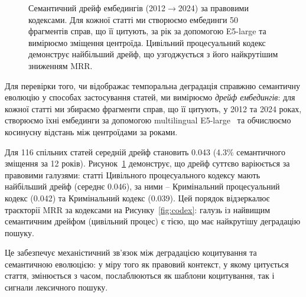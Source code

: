 \begin{figure}[t]
\centering

\caption{Семантичний дрейф ембедингів (2012$\to$2024) за правовими кодексами. Для кожної статті ми створюємо ембединги 50 фрагментів справ, що її цитують, за рік за допомогою E5-large та вимірюємо зміщення центроїда. Цивільний процесуальний кодекс демонструє найбільший дрейф, що узгоджується з його найкрутішим зниженням MRR.}
\label{fig:drift}
\end{figure}

Для перевірки того, чи відображає темпоральна деградація справжню семантичну еволюцію у способах застосування статей, ми вимірюємо \emph{дрейф ембедингів}: для кожної статті ми збираємо фрагменти справ, що її цитують, у 2012 та 2024 роках, створюємо їхні ембединги за допомогою multilingual E5-large~\citep{wang2024multilingual} та обчислюємо косинусну відстань між центроїдами за роками.

Для 116 спільних статей середній дрейф становить 0.043 (4.3\% семантичного зміщення за 12 років).
Рисунок~\ref{fig:drift} демонструє, що дрейф суттєво варіюється за правовими галузями:
статті Цивільного процесуального кодексу мають найбільший дрейф (середнє 0.046), за ними -- Кримінальний процесуальний кодекс (0.042) та Кримінальний кодекс (0.039).
Цей порядок відзеркалює траєкторії MRR за кодексами на Рисунку~\ref{fig:codex}: галузь із найвищим семантичним дрейфом (цивільний процес) є тією, що має найкрутішу деградацію пошуку.

Це забезпечує механістичний зв'язок між деградацією коцитування та семантичною еволюцією: у міру того як правовий контекст, у якому цитується стаття, змінюється з часом, послаблюються як шаблони коцитування, так і сигнали лексичного пошуку.
